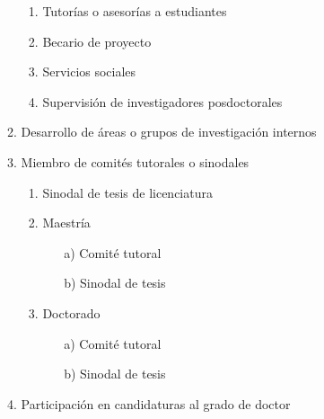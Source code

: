\documentclass[12pt]{report}
\begin{document}
\begin{enumerate}
\begin{enumerate}
\begin{enumerate}
        		\item Tutorías o asesorías a estudiantes
        		\item Becario de proyecto
        		\item Servicios sociales
        		\item Supervisión de investigadores posdoctorales
        		\end{enumerate}
        	\item Desarrollo de áreas o grupos de investigación internos
        	\item Miembro de comités tutorales o sinodales
        		\begin{enumerate}
        		\item Sinodal de tesis de licenciatura
        		\item Maestría
        			\begin{itemize}
        			\item[a)] Comité tutoral
        			\item[b)] Sinodal de tesis
        			\end{itemize}
        		\item Doctorado
        			\begin{itemize}
        			\item[a)] Comité tutoral
        			\item[b)] Sinodal de tesis
        			\end{itemize}
        		\end{enumerate}
        	\item Participación en candidaturas al grado de doctor
        	\end{enumerate}


\end{enumerate}
\end{document}
